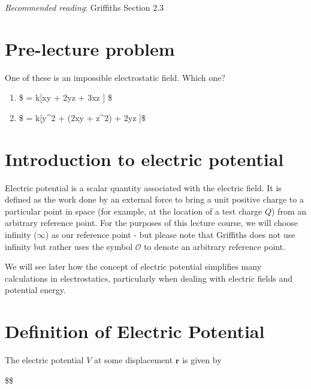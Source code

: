 \documentclass[
  letterpaper,
  DIV=11,
  numbers=noendperiod]{scrreprt}
\begin{document}
\newcommand{\a}{\mathrm{\mathbf{a}}}
\newcommand{\b}{\mathrm{\mathbf{b}}}

\emph{Recommended reading}: Griffiths Section 2.3

\section{Pre-lecture problem}\label{pre-lecture-problem-1}

One of these is an impossible electrostatic field. Which one?

\begin{enumerate}
\def\labelenumi{(\alph{enumi})}
\item
  \$  = k{[}xy  +
  2yz + 3xz  {]} \$
\item
  \$  = k{[}y\^{}2  + (2xy +
  z\^{}2) + 2yz  {]}\$
\end{enumerate}

\section{Introduction to electric
potential}\label{introduction-to-electric-potential}

Electric potential is a scalar quantity associated with the electric
field. It is defined as the work done by an external force to bring a
unit positive charge to a particular point in space (for example, at the
location of a test charge \(Q\)) from an arbitrary reference point. For
the purposes of this lecture course, we will choose infinity
(\(\infty\)) as our reference point - but please note that Griffiths
does not use infinity but rather uses the symbol \(\mathcal{O}\) to
denote an arbitrary reference point.

We will see later how the concept of electric potential simplifies many
calculations in electrostatics, particularly when dealing with electric
fields and potential energy.

\section{Definition of Electric
Potential}\label{definition-of-electric-potential}

The electric potential \(V\) at some displacement
\(\mathrm{\mathbf{r}}\) is given by

\$\$
\end{document}

